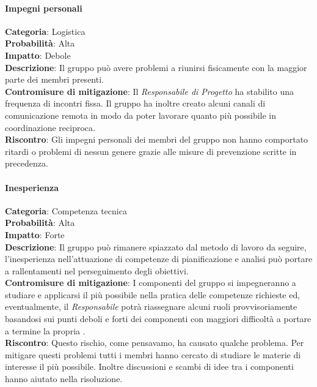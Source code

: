 \documentclass{scalatekids-article}
\begin{document}
\paragraph{Impegni personali}
\textbf{Categoria}: Logistica\\
\textbf{Probabilità}: Alta\\
\textbf{Impatto}: Debole\\
\textbf{Descrizione}: Il gruppo può avere problemi a riunirsi fisicamente con la maggior parte dei membri presenti.\\
\textbf{Contromisure di mitigazione}: Il \textit{Responsabile di Progetto} ha stabilito una frequenza di incontri fissa.
Il gruppo ha inoltre creato alcuni canali di comunicazione remota in modo da poter lavorare quanto più possibile in
coordinazione reciproca.\\
\textbf{Riscontro}: Gli impegni personali dei membri del gruppo non hanno comportato ritardi o problemi di nessun genere grazie alle misure di prevenzione scritte in precedenza.\\
\paragraph{Inesperienza}
\textbf{Categoria}: Competenza tecnica\\
\textbf{Probabilità}: Alta\\
\textbf{Impatto}: Forte\\
\textbf{Descrizione}: Il gruppo può rimanere spiazzato dal metodo di lavoro da seguire, l'inesperienza nell'attuazione
di competenze di pianificazione e analisi può portare a rallentamenti nel perseguimento degli obiettivi.\\
\textbf{Contromisure di mitigazione}: I componenti del gruppo si impegneranno a studiare e applicarsi il più possibile
nella pratica delle competenze richieste ed, eventualmente, il \textit{Responsabile} potrà riassegnare alcuni ruoli provvisoriamente
basandosi sui punti deboli e forti dei componenti con maggiori difficoltà a portare a termine la propria .\\
\textbf{Riscontro}: Questo rischio, come pensavamo, ha causato qualche problema. Per mitigare questi problemi tutti i membri hanno cercato di studiare le materie di interesse il più possibile. Inoltre discussioni e scambi di idee tra i componenti hanno aiutato nella risoluzione.\\
\label{sub:tecnologie}
\end{document}
